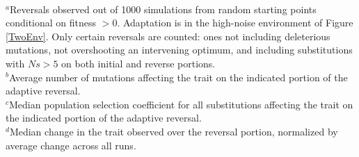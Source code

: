 \documentclass[dvips,12pt,twoside,titlepage]{article}
\begin{document}
\renewcommand{\thetable}{\textbf{\arabic{table}}}
\begin{table}[p]
\caption{\textbf{Reversals during adaptation from random starting points with discrete-sized mutational effects}}\label{popsimTable}
\vspace{0.3cm}
\vspace{0.2cm}\\
$^{a}$\small{Reversals observed out of 1000 simulations from random starting points conditional on fitness $> 0$. Adaptation is in the high-noise environment of Figure \ref{TwoEnv}. Only certain reversals are counted: ones not including deleterious mutations, not overshooting an intervening optimum, and including substitutions with $Ns > 5$ on both initial and reverse portions.}\\
$^{b}$\small{Average number of mutations affecting the trait on the indicated portion of the adaptive reversal.}\\
$^{c}$\small{Median population selection coefficient for all substitutions affecting the trait on the indicated portion of the adaptive reversal.}\\
$^{d}$\small{Median change in the trait observed over the reversal portion, normalized by average change across all runs.}\\
\end{table}
\clearpage
\end{document}
